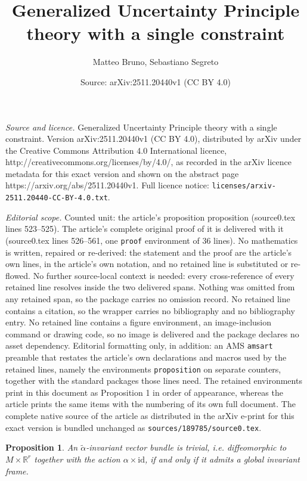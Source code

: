 \documentclass[10pt,a4paper]{amsart}
\title{Generalized Uncertainty Principle theory with a single constraint}
\author{Matteo Bruno, Sebastiano Segreto}
\date{Source: arXiv:2511.20440v1 (CC BY 4.0)}
\newtheorem{proposition}{Proposition}
\newcommand{\R}{\mathbb{R}}
\begin{document}
\maketitle

\noindent\emph{Source and licence.} Generalized Uncertainty Principle theory with a single constraint. Version arXiv:2511.20440v1 (CC BY 4.0), distributed by arXiv under the Creative Commons Attribution 4.0 International licence, http://creativecommons.org/licenses/by/4.0/, as recorded in the arXiv licence metadata for this exact version and shown on the abstract page https://arxiv.org/abs/2511.20440v1. Full licence notice: \texttt{licenses/arxiv-2511.20440-CC-BY-4.0.txt}.\par\smallskip

\noindent\textit{Editorial scope.} Counted unit: the article's proposition proposition (source0.tex lines 523--525). The article's complete original proof of it is delivered with it (source0.tex lines 526--561, one \texttt{proof} environment of 36 lines). No mathematics is written, repaired or re-derived: the statement and the proof are the article's own lines, in the article's own notation, and no retained line is substituted or re-flowed.  No further source-local context is needed: every cross-reference of every retained line resolves inside the two delivered spans.  Nothing was omitted from any retained span, so the package carries no omission record.  No retained line contains a citation, so the wrapper carries no bibliography and no bibliography entry.  No retained line contains a figure environment, an image-inclusion command or drawing code, so no image is delivered and the package declares no asset dependency.  Editorial formatting only, in addition: an AMS \texttt{amsart} preamble that restates the article's own declarations and macros used by the retained lines, namely the environments \texttt{proposition} on separate counters, together with the standard packages those lines need.  The retained environments print in this document as Proposition 1 in order of appearance, whereas the article prints the same items with the numbering of its own full document.  The complete native source of the article as distributed in the arXiv e-print for this exact version is bundled unchanged as \texttt{sources/189785/source0.tex}.
\begin{proposition}
    An $\tilde\alpha$-invariant vector bundle is trivial, i.e. diffeomorphic to $M\times\R^r$ together with the action $\alpha\times\mathrm{id}$, if and only if it admits a global invariant frame.
\end{proposition}
\end{document}
